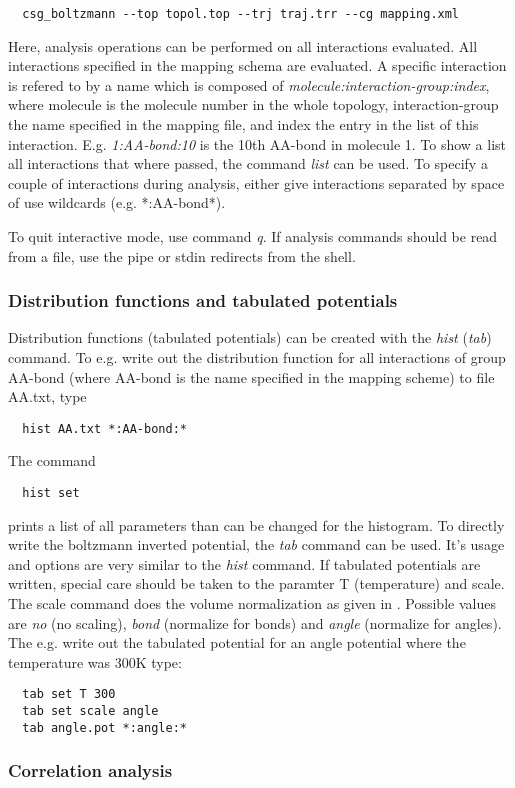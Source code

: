 \begin{verbatim}
  csg_boltzmann --top topol.top --trj traj.trr --cg mapping.xml 
\end{verbatim}

Here, analysis operations can be performed on all interactions evaluated. All interactions specified in the mapping schema are evaluated. A specific interaction is refered to by a name which is composed of \textit{molecule:interaction-group:index}, where molecule is the molecule number in the whole topology, interaction-group the name specified in the mapping file, and index the entry in the list of this interaction. E.g. \textit{1:AA-bond:10} is the 10th AA-bond in molecule 1. To show a list all interactions that where passed, the command \textit{list} can be used. To specify a couple of interactions during analysis, either give interactions separated by space of use wildcards (e.g. *:AA-bond*).

To quit interactive mode, use command \textit{q}. If analysis commands should be read from a file, use the pipe or stdin redirects from the shell.

\subsubsection{Distribution functions and tabulated potentials}
Distribution functions (tabulated potentials) can be created with the \textit{hist} (\textit{tab}) command.
To e.g. write out the distribution function for all interactions of group AA-bond (where AA-bond is the name specified in the mapping scheme) to file AA.txt, type
\begin{verbatim}
  hist AA.txt *:AA-bond:*   
\end{verbatim}
The command
\begin{verbatim}
  hist set
\end{verbatim}
prints a list of all parameters than can be changed for the histogram. To directly write the boltzmann inverted potential, the \textit{tab} command can be used. It's usage and options are very similar to the \textit{hist} command. If tabulated potentials are written, special care should be taken to the paramter T (temperature) and scale. The scale command does the volume normalization as given in     . Possible values are \textit{no} (no scaling), \textit{bond} (normalize for bonds) and \textit{angle} (normalize for angles). The e.g. write out the tabulated potential for an angle potential where the temperature was 300K type:
\begin{verbatim}
  tab set T 300
  tab set scale angle
  tab angle.pot *:angle:*
\end{verbatim}

\subsubsection{Correlation analysis}
